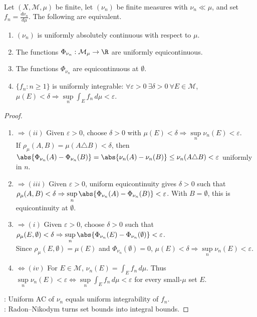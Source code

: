 \begin{proposition} \label{prop:uniform-absolute-continuity-rn-derivatives} \\
Let $(X,\mathcal{M},\mu)$ be finite, let $(\nu_n)$ be finite measures with $\nu_n\ll\mu$, and set $f_n=\frac{d\nu_n}{d\mu}$. The following are equivalent.
\begin{enumerate}[label=(\roman*)]
\setlength{\itemsep}{0pt}
\item $(\nu_n)$ is uniformly absolutely continuous with respect to $\mu$.
\item The functions $\Phi_{\nu_n}:\mathcal{M}_\mu\to\R$ are uniformly equicontinuous.
\item The functions $\Phi_{\nu_n}$ are equicontinuous at $\emptyset$.
\item $\{f_n:n\geq1\}$ is uniformly integrable: $\forall\varepsilon>0\ \exists\delta>0\ \forall E\in\mathcal{M}$, $\mu(E)<\delta\Rightarrow\sup\limits_n\int_Ef_n\,d\mu<\varepsilon$.
\end{enumerate}
\begin{proof}
\begin{enumerate}[label=(\roman*)]
\setlength{\itemsep}{0pt}
\item[$(i)$]$\Rightarrow(ii)$ Given $\varepsilon>0$, choose $\delta>0$ with $\mu(E)<\delta\Rightarrow\sup\limits_n\nu_n(E)<\varepsilon$.\\
If $\rho_\mu(A,B)=\mu(A\triangle B)<\delta$, then $\abs{\Phi_{\nu_n}(A)-\Phi_{\nu_n}(B)}=\abs{\nu_n(A)-\nu_n(B)}\leq\nu_n(A\triangle B)<\varepsilon$ uniformly in $n$.
\item[$(ii)$]$\Rightarrow(iii)$ Given $\varepsilon>0$, uniform equicontinuity gives $\delta>0$ such that\\
$\rho_\mu(A,B)<\delta\Rightarrow\sup\limits_n\abs{\Phi_{\nu_n}(A)-\Phi_{\nu_n}(B)}<\varepsilon$. With $B=\emptyset$, this is equicontinuity at $\emptyset$.
\item[$(iii)$]$\Rightarrow(i)$ Given $\varepsilon>0$, choose $\delta>0$ such that $\rho_\mu(E,\emptyset)<\delta\Rightarrow\sup\limits_n\abs{\Phi_{\nu_n}(E)-\Phi_{\nu_n}(\emptyset)}<\varepsilon$.\\
Since $\rho_\mu(E,\emptyset)=\mu(E)$ and $\Phi_{\nu_n}(\emptyset)=0$, $\mu(E)<\delta\Rightarrow\sup\limits_n\nu_n(E)<\varepsilon$.
\item[$(i)$]$\Leftrightarrow(iv)$ For $E\in\mathcal{M}$, $\nu_n(E)=\int_Ef_n\,d\mu$. Thus $\sup\limits_n\nu_n(E)<\varepsilon\Leftrightarrow\sup\limits_n\int_Ef_n\,d\mu<\varepsilon$ for every small-$\mu$ set $E$.
\end{enumerate}
: Uniform AC of $\nu_n$ equals uniform integrability of $f_n$.\\
: Radon--Nikodym turns set bounds into integral bounds.
\end{proof}
\end{proposition}

